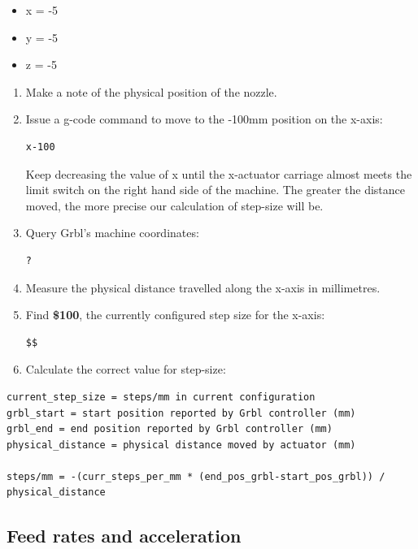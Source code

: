 \documentclass[]{book}
\providecommand{\tightlist}{%
  \setlength{\itemsep}{0pt}\setlength{\parskip}{0pt}}
\theoremstyle{definition}
\theoremstyle{definition}
\theoremstyle{remark}
\begin{document}
\begin{itemize}
\tightlist
\item
  x = -5
\item
  y = -5
\item
  z = -5
\end{itemize}

\begin{enumerate}
\def\labelenumi{\arabic{enumi}.}
\setcounter{enumi}{2}
\item
  Make a note of the physical position of the nozzle.
\item
  Issue a g-code command to move to the -100mm position on the x-axis:

\begin{verbatim}
x-100
\end{verbatim}

  Keep decreasing the value of x until the x-actuator carriage almost
  meets the limit switch on the right hand side of the machine. The
  greater the distance moved, the more precise our calculation of
  step-size will be.
\item
  Query Grbl's machine coordinates:

\begin{verbatim}
?
\end{verbatim}
\item
  Measure the physical distance travelled along the x-axis in
  millimetres.
\item
  Find \textbf{\$100}, the currently configured step size for the
  x-axis:

\begin{verbatim}
$$
\end{verbatim}
\item
  Calculate the correct value for step-size:
\end{enumerate}

\begin{verbatim}
current_step_size = steps/mm in current configuration
grbl_start = start position reported by Grbl controller (mm)
grbl_end = end position reported by Grbl controller (mm)
physical_distance = physical distance moved by actuator (mm)

steps/mm = -(curr_steps_per_mm * (end_pos_grbl-start_pos_grbl)) / physical_distance
\end{verbatim}

\subsection{Feed rates and
acceleration}\label{feed-rates-and-acceleration}
\end{document}
